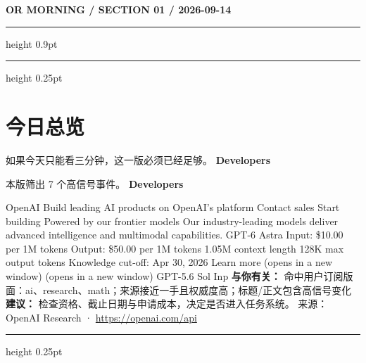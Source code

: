 \documentclass[10.5pt]{ctexart}
\begin{document}
{\small\bfseries OR MORNING / SECTION 01 / 2026-09-14}
\vspace{2mm}
\hrule height 0.9pt
\vspace{1.5mm}
\hrule height 0.25pt
\vspace{4mm}
\section*{今日总览}
{\color{ormuted} 如果今天只能看三分钟，这一版必须已经足够。}
\vspace{2mm}
{\fontsize{25}{29}\selectfont\bfseries Developers}\par
\vspace{2mm}
{\large 本版筛出 7 个高信号事件。}
\vspace{3mm}
{\Large\bfseries Developers}\par
OpenAI Build leading AI products on OpenAI’s platform Contact sales Start building Powered by our frontier models Our industry-leading models deliver advanced intelligence and multimodal capabilities. GPT-6 Astra Input: \$10.00 per 1M tokens Output: \$50.00 per 1M tokens 1.05M context length 128K max output tokens Knowledge cut-off: Apr 30, 2026 Learn more (opens in a new window) (opens in a new window) GPT-5.6 Sol Inp
\textbf{与你有关：} 命中用户订阅版面：ai、research、math；来源接近一手且权威度高；标题/正文包含高信号变化
\textbf{建议：} 检查资格、截止日期与申请成本，决定是否进入任务系统。
{\footnotesize\color{ormuted} 来源：OpenAI Research · \url{https://openai.com/api}}
\vspace{3mm}
\hrule height 0.25pt
\vspace{3mm}
\end{document}
